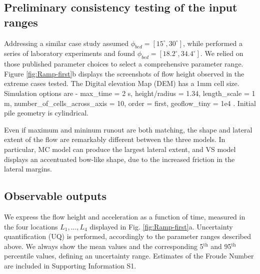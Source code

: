 \documentclass{article}
\begin{document}
\subsection{Preliminary consistency testing of the input ranges}\label{consistency}
Addressing a similar case study \cite{Dalbey2008} assumed $\phi_{bed}=[15^\mathrm{\circ}, 30^\mathrm{\circ}]$, while \cite{WebbBursik2016} performed a series of laboratory experiments and found $\phi_{bed}=[18.2^\mathrm{\circ}, 34.4^\mathrm{\circ}]$. We relied on those published parameter choices to select a comprehensive parameter range. Figure \ref{fig:Ramp-first}b displays the screenshots of flow height observed in the extreme cases tested. The Digital elevation Map (DEM) has a 1mm cell size. Simulation options are - max\_time = 2 s, height/radius = 1.34, length\_scale = 1 m, number\_of\_cells\_across\_axis = 10, order = first, geoflow\_tiny = 1e4 \citep{Patra2005,Aghakhani2016}. Initial pile geometry is cylindrical.


Even if maximum and mininum runout are both matching, the shape and lateral extent of the flow are remarkably different between the three models. In particular, MC model can produce the largest lateral extent, and VS model displays an accentuated bow-like shape, due to the increased friction in the lateral margins.

\subsection{Observable outputs} \label{Obs1}
We express the flow height and acceleration as a function of time, measured in the four locations $L_1,\dots, L_4$ displayed in Fig. \ref{fig:Ramp-first}a. Uncertainty quantification (UQ) is performed, accordingly to the parameter ranges described above. We always show the mean values and the corresponding 5$^{\mathrm{th}}$ and 95$^{\mathrm{th}}$ percentile values, defining an uncertainty range. Estimates of the Froude Number are included in Supporting Information S1.
\end{document}
